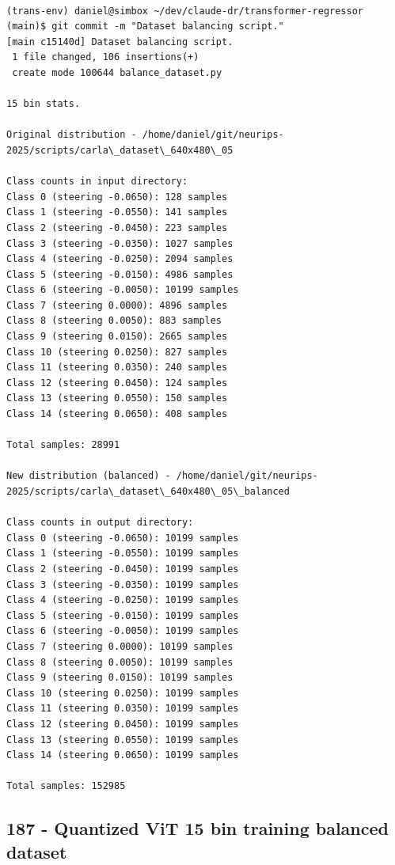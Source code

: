 \begin{verbatim}

(trans-env) daniel@simbox ~/dev/claude-dr/transformer-regressor (main)$ git commit -m "Dataset balancing script."
[main c15140d] Dataset balancing script.
 1 file changed, 106 insertions(+)
 create mode 100644 balance_dataset.py

15 bin stats.

Original distribution - /home/daniel/git/neurips-2025/scripts/carla\_dataset\_640x480\_05

Class counts in input directory:
Class 0 (steering -0.0650): 128 samples
Class 1 (steering -0.0550): 141 samples
Class 2 (steering -0.0450): 223 samples
Class 3 (steering -0.0350): 1027 samples
Class 4 (steering -0.0250): 2094 samples
Class 5 (steering -0.0150): 4986 samples
Class 6 (steering -0.0050): 10199 samples
Class 7 (steering 0.0000): 4896 samples
Class 8 (steering 0.0050): 883 samples
Class 9 (steering 0.0150): 2665 samples
Class 10 (steering 0.0250): 827 samples
Class 11 (steering 0.0350): 240 samples
Class 12 (steering 0.0450): 124 samples
Class 13 (steering 0.0550): 150 samples
Class 14 (steering 0.0650): 408 samples

Total samples: 28991

New distribution (balanced) - /home/daniel/git/neurips-2025/scripts/carla\_dataset\_640x480\_05\_balanced

Class counts in output directory:
Class 0 (steering -0.0650): 10199 samples
Class 1 (steering -0.0550): 10199 samples
Class 2 (steering -0.0450): 10199 samples
Class 3 (steering -0.0350): 10199 samples
Class 4 (steering -0.0250): 10199 samples
Class 5 (steering -0.0150): 10199 samples
Class 6 (steering -0.0050): 10199 samples
Class 7 (steering 0.0000): 10199 samples
Class 8 (steering 0.0050): 10199 samples
Class 9 (steering 0.0150): 10199 samples
Class 10 (steering 0.0250): 10199 samples
Class 11 (steering 0.0350): 10199 samples
Class 12 (steering 0.0450): 10199 samples
Class 13 (steering 0.0550): 10199 samples
Class 14 (steering 0.0650): 10199 samples

Total samples: 152985

\end{verbatim}

\subsection{187 - Quantized ViT 15 bin training balanced dataset}
\label{app_res:187}

